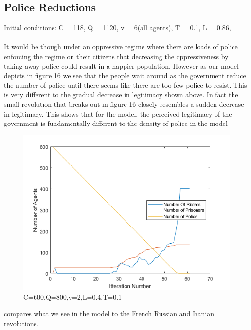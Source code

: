 \documentclass[11pt]{article}
\begin{document}
	\subsection{Police Reductions}
	Initial conditions: C = 118, Q = 1120, v = 6(all agents), T = 0.1, L = 0.86, \\
	\\
	It would be though under an oppressive regime where there are loads of police enforcing the regime on their citizens that decreasing the oppressiveness by taking away police could result in a happier population. However as our model depicts in figure 16 we see that the people wait around as the government reduce the number of police until there seems like there are too few police to resist. This is very different to the gradual decrease in legitimacy shown above. In fact the small revolution that breaks out in figure 16 closely resembles a sudden decrease in legitimacy. This shows that for the model, the perceived legitimacy of the government is fundamentally different to the density of police in the model
	\begin{figure}[H]
		\includegraphics[width=\linewidth]{Police Reductions.png}
		\caption{C=600,Q=800,v=2,L=0.4,T=0.1}
		\label{fig:frenchriot}
	\end{figure}
	\citet{epstein2002modeling} compares what we see in the model to the French Russian and Iranian revolutions.
\end{document}
